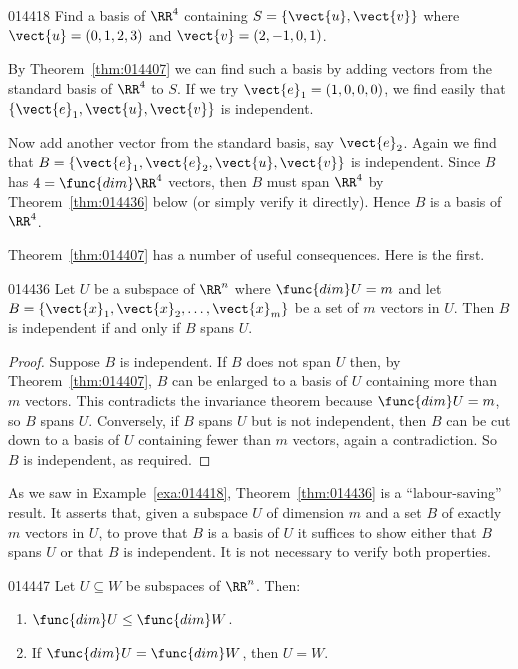 \begin{example}{}{014418}
Find a basis of $\RR^4$ containing $S = \{\vect{u}, \vect{v}\}$ where $\vect{u} = (0, 1, 2, 3)$ and $\vect{v} = (2, -1, 0, 1)$.

\begin{solution}
By Theorem~\ref{thm:014407} we can find such a basis by adding vectors from the standard basis of $\RR^4$ to $S$. If we try $\vect{e}_{1} = (1, 0, 0, 0)$, we find easily that $\{\vect{e}_{1}, \vect{u}, \vect{v}\}$ is independent. 

Now add another vector from the standard basis, say $\vect{e}_{2}$. Again we find that $B = \{\vect{e}_{1}, \vect{e}_{2}, \vect{u}, \vect{v}\}$ is independent. Since $B$ has $4 = \func{dim} \RR^4$ vectors, then $B$ must span $\RR^4$ by Theorem~\ref{thm:014436} below (or simply verify it directly). Hence $B$ is a basis of $\RR^4$.
\end{solution}
\end{example}

\noindent Theorem~\ref{thm:014407} has a number of useful consequences. Here is the first.

\begin{theorem}{}{014436} %
Let $U$ be a subspace of $\RR^n$ where $\func{dim} U = m$ and let $B = \{\vect{x}_{1}, \vect{x}_{2}, \dots, \vect{x}_{m}\}$ be a set of $m$ vectors in $U$. Then $B$ is independent if and only if $B$ spans $U$.
\end{theorem}

\begin{proof}
Suppose $B$ is independent. If $B$ does not span $U$ then, by Theorem~\ref{thm:014407}, $B$ can be enlarged to a basis of $U$ containing more than $m$ vectors. This contradicts the invariance theorem because $\func{dim} U = m$, so $B$ spans $U$. Conversely, if $B$ spans $U$ but is not independent, then $B$ can be cut down to a basis of $U$ containing fewer than $m$ vectors, again a contradiction. So $B$ is independent, as required.
\end{proof}

As we saw in Example~\ref{exa:014418}, Theorem~\ref{thm:014436} is a ``labour-saving'' result. It asserts that, given a subspace $U$ of dimension $m$ and a set $B$ of exactly $m$ vectors in $U$, to prove that $B$ is a basis of $U$ it suffices to show either that $B$ spans $U$ or that $B$ is independent. It is not necessary to verify both properties.

\begin{theorem}{}{014447} %
Let $U \subseteq W$ be subspaces of $\RR^n$. Then:

\begin{enumerate}
\item $\func{dim} U \leq \func{dim} W$.

\item If $\func{dim} U = \func{dim} W$, then $U = W$.

\end{enumerate}
\end{theorem}


